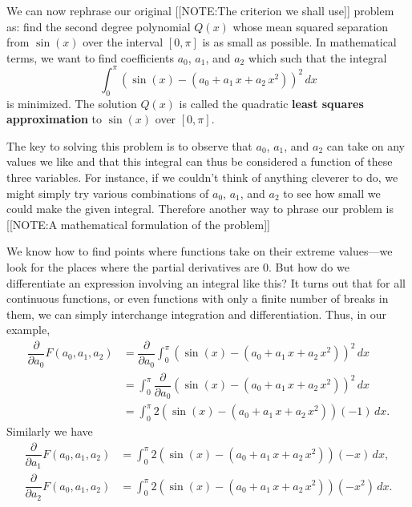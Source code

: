 We can now rephrase our original 
[[NOTE:The criterion  we shall use]]
problem as: find the second degree polynomial $Q(x)$ whose mean
squared separation from $\sin(x)$ over the interval $[0, \pi]$ is as
small as possible.  In mathematical terms, we want to find
coefficients $a_0$, $a_1$, and $a_2$ which such that the integral
\[
\int_0^{\pi} \left( \sin(x) - (a_0 + a_1\,x + a_2\,x^2)\right)^2 \, dx
\]
is minimized. The solution $Q(x)$ is called the quadratic {\bf least
  squares approximation} to
$\sin(x)$ over $[0,\pi]$.

The key to solving this problem is to observe that $a_0$, $a_1$, and $a_2$ can take on any values we like and that this integral can thus be considered a function of these three variables. For instance, if we couldn't think of anything cleverer to do, we might simply try various combinations of $a_0$, $a_1$, and $a_2$ to see how small we could make the given integral.  Therefore another way to phrase our problem is
[[NOTE:A mathematical formulation of the problem]]


\begin{center}
\end{center}




We know how to find points where functions take on their extreme
values---we look for the places where the partial derivatives are
0. But how do we differentiate an expression involving an integral
like this?  It turns out that for all continuous functions, or even
functions with only a finite number of breaks in them, we can simply
interchange integration and differentiation.  Thus, in our example,
\begin{align*}
\dfrac{\partial}{\partial a_0}F(a_0, a_1, a_2)
  &= \dfrac{\partial}{\partial a_0}\int_0^{\pi} 
     \left( \sin(x) - (a_0 + a_1\,x + a_2\,x^2)\right)^2 \, dx \\[.15in]
  &= \int_0^{\pi} \dfrac{\partial}{\partial a_0}
     \left( \sin(x) - (a_0 + a_1\,x + a_2\,x^2)\right)^2 \, dx \\[.15in]
  &= \int_0^{\pi}2\left( \sin(x) - (a_0 + a_1\,x + a_2\,x^2)\right)(-1) \, dx.
\end{align*}
Similarly we have
\begin{align*}
\dfrac{\partial}{\partial a_1}F(a_0, a_1, a_2)
  &= \int_0^{\pi}2\left( \sin(x) 
            - (a_0 + a_1\,x + a_2\,x^2)\right)(-x) \, dx, \\[.15in]
\dfrac{\partial}{\partial a_2}F(a_0, a_1, a_2)
  &= \int_0^{\pi}2\left( \sin(x) 
             - (a_0 + a_1\,x + a_2\,x^2)\right)(-x^2) \, dx.
\end{align*}

